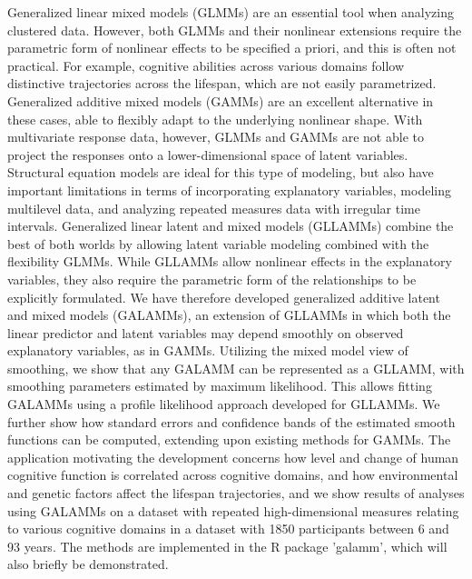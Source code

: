 Generalized linear mixed models (GLMMs) are an essential tool when analyzing clustered data. However, both GLMMs and their nonlinear extensions require the parametric form of nonlinear effects to be specified a priori, and this is often not practical. For example, cognitive abilities across various domains follow distinctive trajectories across the lifespan, which are not easily parametrized. Generalized additive mixed models (GAMMs) are an excellent alternative in these cases, able to flexibly adapt to the underlying nonlinear shape. With multivariate response data, however, GLMMs and GAMMs are not able to project the responses onto a lower-dimensional space of latent variables. Structural equation models are ideal for this type of modeling, but also have important limitations in terms of incorporating explanatory variables, modeling multilevel data, and analyzing repeated measures data with irregular time intervals. Generalized linear latent and mixed models (GLLAMMs)\cite{rabe-hesketh2004} combine the best of both worlds by allowing latent variable modeling combined with the flexibility GLMMs. While GLLAMMs allow nonlinear effects in the explanatory variables, they also require the parametric form of the relationships to be explicitly formulated. We have therefore developed generalized additive latent and mixed models (GALAMMs), an extension of GLLAMMs in which both the linear predictor and latent variables may depend smoothly on observed explanatory variables, as in GAMMs. Utilizing the mixed model view of smoothing, we show that any GALAMM can be represented as a GLLAMM, with smoothing parameters estimated by maximum likelihood. This allows fitting GALAMMs using a profile likelihood approach developed for GLLAMMs\cite{jeon2012}. We further show how standard errors and confidence bands of the estimated smooth functions can be computed, extending upon existing methods for GAMMs. The application motivating the development concerns how level and change of human cognitive function is correlated across cognitive domains, and how environmental and genetic factors affect the lifespan trajectories, and we show results of analyses using GALAMMs on a dataset with repeated high-dimensional measures relating to various cognitive domains in a dataset with 1850 participants between 6 and 93 years. The methods are implemented in the R package 'galamm', which will also briefly be demonstrated. 


